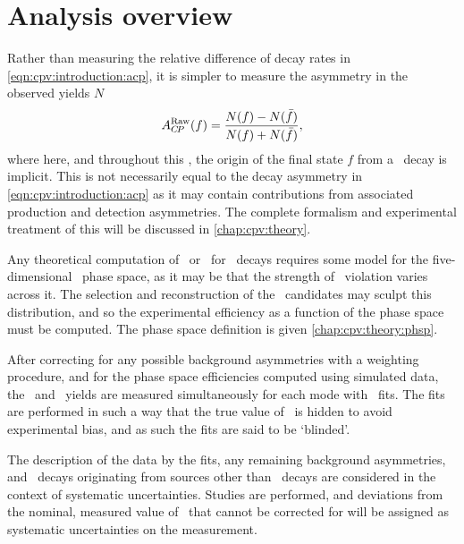 \section{Analysis overview}
\label{chap:cpv:introduction:overview}

Rather than measuring the relative difference of decay rates in 
\cref{eqn:cpv:introduction:acp}, it is simpler to measure the asymmetry in the 
observed yields $N$
\begin{equation}
  A_{C\!P}^{\textnormal{Raw}}(f) = \frac{N(f) - N(\bar{f})}{N(f) + N(\bar{f})},
  \label{eqn:cpv:introduction:araw}
\end{equation}
where here, and throughout this , the origin of the final 
state $f$ from a \PLambdac\ decay is implicit.\footnotemark
This is not necessarily equal to the decay asymmetry in 
\cref{eqn:cpv:introduction:acp} as it may contain contributions from associated 
production and detection asymmetries.
The complete formalism and experimental treatment of this will be discussed in 
\cref{chap:cpv:theory}.


Any theoretical computation of \ACP\ or \dACP\ for \LcTophh\ decays requires 
some model for the five-dimensional \phh\ phase space, as it may be that the 
strength of \CP\ violation varies across it.
The selection and reconstruction of the \PLambdac\ candidates may sculpt this 
distribution, and so the experimental efficiency as a function of the phase 
space must be computed.
The phase space definition is given \cref{chap:cpv:theory:phsp}.

After correcting for any possible background asymmetries with a weighting 
procedure, and for the phase space efficiencies computed using simulated data, 
the \PLambdac\ and \APLambdac\ yields are measured simultaneously for each mode 
with \chisq\ fits.
The fits are performed in such a way that the true value of \ARaw\ is hidden to 
avoid experimental bias, and as such the fits are said to be `blinded'.

The description of the data by the fits, any remaining background asymmetries, 
and \PLambdac\ decays originating from sources other than \PLambdab\ decays are 
considered in the context of systematic uncertainties.
Studies are performed, and deviations from the nominal, measured value of 
\dACP\ that cannot be corrected for will be assigned as systematic 
uncertainties on the measurement.

